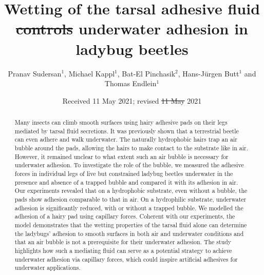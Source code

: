 \documentclass[vruler,JEB]{COB}%
\providecommand{\DIFadd}[1]{{\protect\color{blue}\uwave{#1}}} %
\providecommand{\DIFdel}[1]{{\protect\color{red}\sout{#1}}}                      %
\providecommand{\DIFaddbegin}{} %
\providecommand{\DIFaddend}{} %
\providecommand{\DIFdelbegin}{} %
\providecommand{\DIFdelend}{} %
\begin{document}

\title{Wetting of the tarsal adhesive fluid \DIFdelbegin \DIFdel{controls }\DIFdelend \DIFaddbegin \DIFadd{determines }\DIFaddend underwater adhesion in ladybug beetles}

\author{Pranav Sudersan$^{1}$, Michael Kappl$^{1}$, Bat-El Pinchasik$^{2}$, Hans-J\"{u}rgen Butt$^{1}$ and Thomas Endlein$^{1}$}

\address{
}

\DIFdelbegin %
\DIFdelend \DIFaddbegin {}
\DIFaddend 

\date{Received 11 May 2021; revised \DIFdelbegin \DIFdel{11 May }\DIFdelend \DIFaddbegin \DIFadd{16 September }\DIFaddend 2021} %

\maketitle

\begin{abstract}
Many insects can climb smooth surfaces using hairy adhesive pads on their legs mediated by tarsal fluid secretions. It was previously shown that a terrestrial beetle can even adhere and walk underwater. The naturally hydrophobic hairs trap an air bubble around the pads, allowing the hairs to make contact to the substrate like in air. However, it remained unclear to what extent such an air bubble is necessary for underwater adhesion. To investigate the role of the bubble, we measured the adhesive forces in individual legs of live but constrained ladybug beetles underwater in the presence and absence of a trapped bubble and compared it with its adhesion in air. Our experiments revealed that on a hydrophobic substrate, even without a bubble, the pads show adhesion comparable to that in air. On a hydrophilic substrate, underwater adhesion is significantly reduced, with or without a trapped bubble. We modelled the adhesion of a hairy pad using capillary forces. Coherent with our experiments, the model demonstrates that the wetting properties of the tarsal fluid alone can determine the ladybugs'  adhesion to smooth surfaces in both air and underwater conditions and that an air bubble is not a prerequisite for their underwater adhesion. The study highlights how such a mediating fluid can serve as a potential strategy to achieve underwater adhesion via capillary forces, which could inspire artificial adhesives for underwater applications.
\end{abstract}
\end{document}
